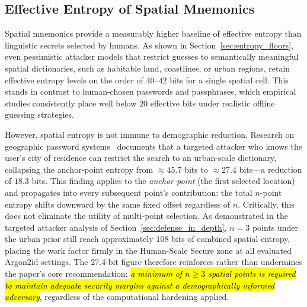 \documentclass[mathematics,article,accept,pdftex,moreauthors]{Definitions/mdpi}
\begin{document}
\subsection{Effective Entropy of Spatial Mnemonics}

{Spatial mnemonics provide a measurably higher baseline of effective entropy than linguistic secrets selected by humans.} As shown in Section~\ref{sec:entropy_floors}, even pessimistic attacker models that restrict guesses to semantically meaningful spatial dictionaries, such as habitable land, coastlines, or urban regions, retain effective entropy levels on the order of $40$--$42$ bits for a single spatial cell. This stands in contrast to human-chosen passwords and passphrases, which empirical studies consistently place well below $20$ effective bits under realistic offline guessing strategies.

However, spatial entropy is not immune to demographic reduction. Research on geographic password systems~\cite{Sun2012, Thorpe2013, AlAmeen2014} documents that a targeted attacker who knows the user's city of residence can restrict the search to an urban-scale dictionary, collapsing the anchor-point entropy from $\approx\!45.7$ bits to $\approx\!27.4$ bits---a reduction of $18.3$ bits. This finding applies to the \emph{anchor point} (the first selected location) and propagates into every subsequent point's contribution: the total $n$-point entropy shifts downward by the same fixed offset regardless of $n$. Critically, this does not eliminate the utility of multi-point selection. As demonstrated in the targeted attacker analysis of Section~\ref{sec:defense_in_depth}, $n=3$ points under the urban prior still reach approximately $108$ bits of combined spatial entropy, placing the work factor firmly in the Human-Scale Secure zone at all evaluated Argon2id settings. The 27.4-bit figure therefore reinforces rather than undermines the paper's core recommendation: \emph{\hl{a minimum of $n \geq 3$ spatial points is required to maintain adequate security margins against a demographically informed adversary}}, %
 regardless of the computational hardening applied.
\end{document}

